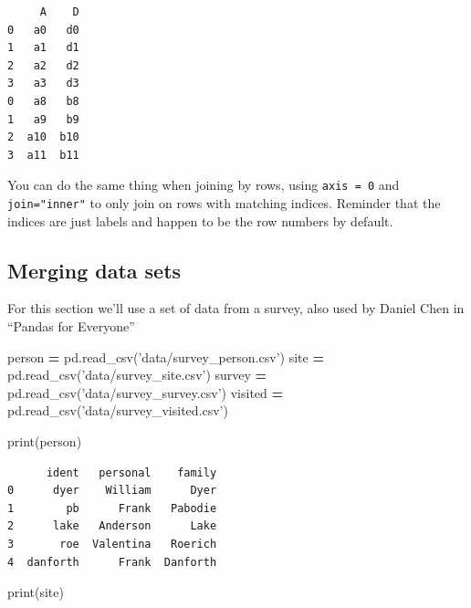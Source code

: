 \documentclass[
  letterpaper,
]{scrbook}
\newenvironment{Shaded}{\begin{snugshade}}{\end{snugshade}}
\newcommand{\BuiltInTok}[1]{#1}
\newcommand{\NormalTok}[1]{#1}
\newcommand{\OperatorTok}[1]{\textcolor[rgb]{0.81,0.36,0.00}{\textbf{#1}}}
\newcommand{\StringTok}[1]{\textcolor[rgb]{0.31,0.60,0.02}{#1}}
\begin{document}
\begin{verbatim}
     A    D
0   a0   d0
1   a1   d1
2   a2   d2
3   a3   d3
0   a8   b8
1   a9   b9
2  a10  b10
3  a11  b11
\end{verbatim}

You can do the same thing when joining by rows, using \texttt{axis\ =\ 0} and \texttt{join="inner"} to only join on rows with matching indices. Reminder that the indices are just labels and happen to be the row numbers by default.

\hypertarget{merging-data-sets}{%
\subsection{Merging data sets}\label{merging-data-sets}}

For this section we'll use a set of data from a survey, also used by Daniel Chen in ``Pandas for Everyone''

\begin{Shaded}
\begin{Highlighting}[]
\NormalTok{person }\OperatorTok{=}\NormalTok{ pd.read_csv(}\StringTok{'data/survey_person.csv'}\NormalTok{)}
\NormalTok{site }\OperatorTok{=}\NormalTok{ pd.read_csv(}\StringTok{'data/survey_site.csv'}\NormalTok{)}
\NormalTok{survey }\OperatorTok{=}\NormalTok{ pd.read_csv(}\StringTok{'data/survey_survey.csv'}\NormalTok{)}
\NormalTok{visited }\OperatorTok{=}\NormalTok{ pd.read_csv(}\StringTok{'data/survey_visited.csv'}\NormalTok{)}
\end{Highlighting}
\end{Shaded}

\begin{Shaded}
\begin{Highlighting}[]
\BuiltInTok{print}\NormalTok{(person)}
\end{Highlighting}
\end{Shaded}

\begin{verbatim}
      ident   personal    family
0      dyer    William      Dyer
1        pb      Frank   Pabodie
2      lake   Anderson      Lake
3       roe  Valentina   Roerich
4  danforth      Frank  Danforth
\end{verbatim}

\begin{Shaded}
\begin{Highlighting}[]
\BuiltInTok{print}\NormalTok{(site)}
\end{Highlighting}
\end{Shaded}
\end{document}

